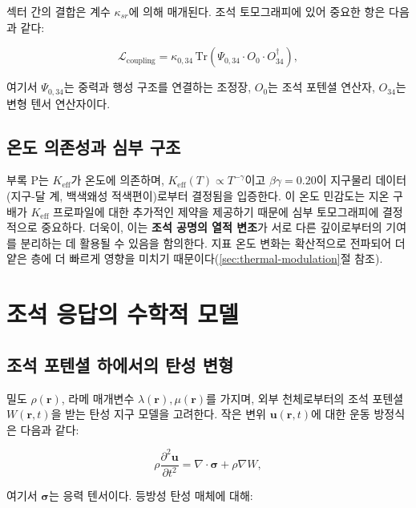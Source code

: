 \documentclass[12pt,a4paper]{article}
\theoremstyle{remark}
\newcommand{\Keff}{K_{\mathrm{eff}}}
\begin{document}
	섹터 간의 결합은 계수 \(\kappa_{sr}\)에 의해 매개된다. 조석 토모그래피에 있어 중요한 항은 다음과 같다:
	
	\begin{equation}
		\mathcal{L}_{\text{coupling}} = \kappa_{0,34} \, \mathrm{Tr}\left(\Psi_{0,34} \cdot O_0 \cdot O_{34}^\dagger\right),
		\label{eq:coupling}
	\end{equation}
	
	여기서 \(\Psi_{0,34}\)는 중력과 행성 구조를 연결하는 조정장, \(O_0\)는 조석 포텐셜 연산자, \(O_{34}\)는 변형 텐서 연산자이다.
	
	\subsection{온도 의존성과 심부 구조}
	
	부록 P는 \(\Keff\)가 온도에 의존하며, \(\Keff(T) \propto T^{-\gamma}\)이고 \(\beta\gamma = 0.20\)이 지구물리 데이터(지구-달 계, 백색왜성 적색편이)로부터 결정됨을 입증한다. 이 온도 민감도는 지온 구배가 \(K_{\mathrm{eff}}\) 프로파일에 대한 추가적인 제약을 제공하기 때문에 심부 토모그래피에 결정적으로 중요하다. 더욱이, 이는 \textbf{조석 공명의 열적 변조}가 서로 다른 깊이로부터의 기여를 분리하는 데 활용될 수 있음을 함의한다. 지표 온도 변화는 확산적으로 전파되어 더 얕은 층에 더 빠르게 영향을 미치기 때문이다(\ref{sec:thermal-modulation}절 참조).
	
	\section{조석 응답의 수학적 모델}
	\label{sec:model}
	
	\subsection{조석 포텐셜 하에서의 탄성 변형}
	
	밀도 \(\rho(\mathbf{r})\), 라메 매개변수 \(\lambda(\mathbf{r}), \mu(\mathbf{r})\)를 가지며, 외부 천체로부터의 조석 포텐셜 \(W(\mathbf{r},t)\)을 받는 탄성 지구 모델을 고려한다. 작은 변위 \(\mathbf{u}(\mathbf{r},t)\)에 대한 운동 방정식은 다음과 같다:
	
	\begin{equation}
		\rho \frac{\partial^2 \mathbf{u}}{\partial t^2} = \nabla \cdot \boldsymbol{\sigma} + \rho \nabla W,
		\label{eq:motion}
	\end{equation}
	
	여기서 \(\boldsymbol{\sigma}\)는 응력 텐서이다. 등방성 탄성 매체에 대해:
	
\end{document}
